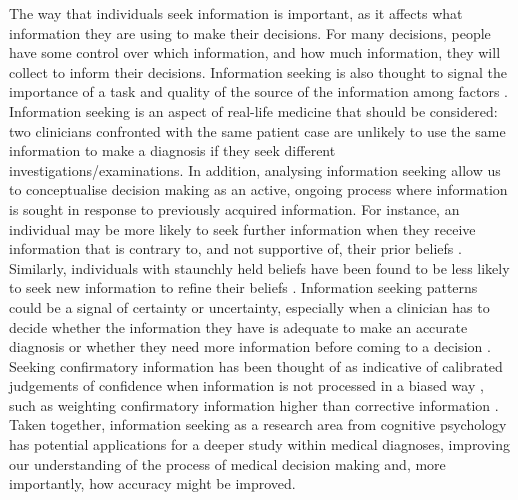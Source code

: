 \documentclass[a4paper, nobind]{templates/ociamthesis}
\begin{document}
The way that individuals seek information is important, as it affects what information they are using to make their decisions. For many decisions, people have some control over which information, and how much information, they will collect to inform their decisions. Information seeking is also thought to signal the importance of a task and quality of the source of the information among factors \autocite{xu_who_2006}. Information seeking is an aspect of real-life medicine that should be considered: two clinicians confronted with the same patient case are unlikely to use the same information to make a diagnosis if they seek different investigations/examinations. In addition, analysing information seeking allow us to conceptualise decision making as an active, ongoing process where information is sought in response to previously acquired information. For instance, an individual may be more likely to seek further information when they receive information that is contrary to, and not supportive of, their prior beliefs \autocite{adams_reduction_1961}. Similarly, individuals with staunchly held beliefs have been found to be less likely to seek new information to refine their beliefs \autocite{schulz_dogmatism_2020}. Information seeking patterns could be a signal of certainty or uncertainty, especially when a clinician has to decide whether the information they have is adequate to make an accurate diagnosis or whether they need more information before coming to a decision \autocite{gehlbach_illusion_2024}. Seeking confirmatory information has been thought of as indicative of calibrated judgements of confidence when information is not processed in a biased way \autocite{rollwage_confidence_2020}, such as weighting confirmatory information higher than corrective information \autocite{schulz-hardt_biased_2000}. Taken together, information seeking as a research area from cognitive psychology has potential applications for a deeper study within medical diagnoses, improving our understanding of the process of medical decision making and, more importantly, how accuracy might be improved.\\
\end{document}
